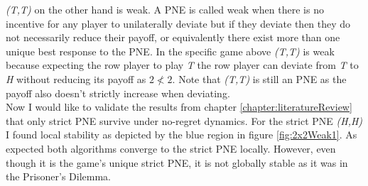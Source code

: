 \textit{(T,T)} on the other hand is weak. A PNE is called weak when there is no incentive for any player to unilaterally deviate but if they deviate then they do not necessarily reduce their payoff, or equivalently there exist more than one unique best response to the PNE. In the specific game above \textit{(T,T)} is weak because expecting the row player to play \textit{T} the row player can deviate from \textit{T} to \textit{H} without reducing its payoff as $2 \nless 2$. Note that \textit{(T,T)} is still an PNE as the payoff also doesn't strictly increase when deviating. \\

Now I would like to validate the results from chapter \ref{chapter:literatureReview} that only strict PNE survive under no-regret dynamics. For the strict PNE \textit{(H,H)} I found local stability as depicted by the blue region in figure \ref{fig:2x2Weak1}. As expected both algorithms converge to the strict PNE locally. However, even though it is the game's unique strict PNE, it is not globally stable as it was in the Prisoner's Dilemma. 

